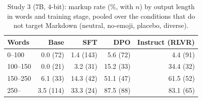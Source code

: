 \begin{table}[t]
\centering
\footnotesize
\caption{Study 3 (7B, 4-bit): markup rate (\%, with $n$) by output length in words and training stage, pooled over the conditions that do not target Markdown (neutral, no-emoji, placebo, diverse).}
\label{tab:v2-length_7b}
\begin{tabular}{lrrrr}
\toprule
Words & Base & SFT & DPO & Instruct (RLVR) \\
\midrule
0--100 & 0.0 (72) & 1.4 (143) & 5.6 (72) & 4.4 (91) \\
100--150 & 0.0 (21) & 3.2 (31) & 15.2 (33) & 34.4 (32) \\
150--250 & 6.1 (33) & 14.3 (42) & 51.1 (47) & 61.5 (52) \\
250-- & 3.5 (114) & 33.3 (24) & 87.5 (88) & 83.1 (65) \\
\bottomrule
\end{tabular}
\end{table}
